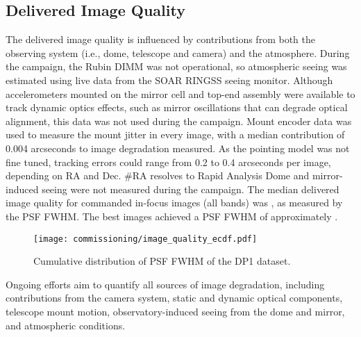 
\subsection{Delivered Image Quality
\label{ssec:image_quality}}
The delivered image quality is influenced by contributions from both the observing system (i.e., dome, telescope and \gls{camera}) and the atmosphere.
During the campaign, the Rubin \gls{DIMM} was not operational, so atmospheric seeing was estimated using live data from the \gls{SOAR} \gls{RINGSS} seeing monitor.
Although accelerometers mounted on the mirror cell and top-end assembly were available to track dynamic optics effects, such as mirror oscillations that can degrade optical alignment, this data was not used during the campaign.
Mount encoder data was used to measure the mount jitter in every image, with a median contribution of 0.004 arcseconds to image degradation measured.
As the pointing model was not fine tuned, tracking errors could range from 0.2 to 0.4 arcseconds per image, depending on RA and Dec.
#RA resolves to Rapid Analysis
Dome and mirror-induced \gls{seeing} were not measured during the campaign.
% 
The median delivered image quality for commanded in-focus images (all bands) was \medianimagequalityallbands, as measured by the \gls{PSF} \gls{FWHM}.
The best images achieved a \gls{PSF} \gls{FWHM} of approximately \bestimagequality.
\begin{figure}[htb!]
\centering
\texttt{[image: commissioning/image\_quality\_ecdf.pdf]}
\caption{Cumulative distribution of \gls{PSF} \gls{FWHM} of the \gls{DP1} dataset.}
\label{fig:delivered_image_quality_ecdf}
\end{figure}
Ongoing efforts aim to quantify all sources of image degradation,  including contributions from the \gls{camera} system, static and dynamic optical components, telescope mount motion,  observatory-induced seeing from the dome and mirror, and atmospheric conditions.

